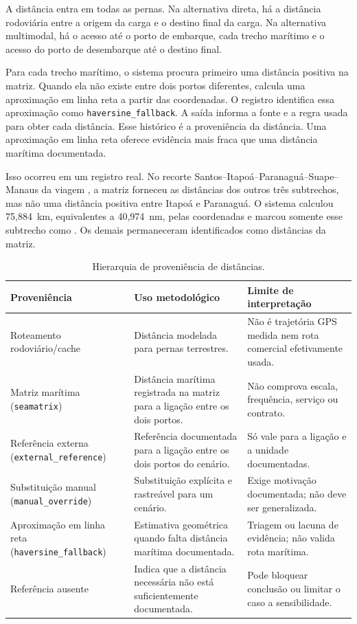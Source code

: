 A distância entra em todas as pernas. Na alternativa direta, há a distância rodoviária entre a origem da carga e o destino final da carga. Na alternativa multimodal, há o acesso até o porto de embarque, cada trecho marítimo e o acesso do porto de desembarque até o destino final.

Para cada trecho marítimo, o sistema procura primeiro uma distância positiva na matriz. Quando ela não existe entre dois portos diferentes, calcula uma aproximação em linha reta a partir das coordenadas. O registro identifica essa aproximação como \texttt{haversine\_fallback}. A saída informa a fonte e a regra usada para obter cada distância. Esse histórico é a proveniência da distância. Uma aproximação em linha reta oferece evidência mais fraca que uma distância marítima documentada.

Isso ocorreu em um registro real. No recorte Santos--Itapoá--Paranaguá--Suape--Manaus da viagem , a matriz forneceu as distâncias dos outros três subtrechos, mas não uma distância positiva entre Itapoá e Paranaguá. O sistema calculou 75,884~km, equivalentes a 40,974~nm, pelas coordenadas e marcou somente esse subtrecho como . Os demais permaneceram identificados como distâncias da matriz.

\begin{table}[htbp]
\centering
\small
\caption{Hierarquia de proveniência de distâncias.}
\label{tab:proveniencia-distancias}
\begin{tabularx}{\textwidth}{L{0.24\textwidth}Y Y}
\toprule
Proveniência & Uso metodológico & Limite de interpretação \\
\midrule
Roteamento rodoviário/cache & Distância modelada para pernas terrestres. & Não é trajetória GPS medida nem rota comercial efetivamente usada.\\
Matriz marítima (\texttt{seamatrix}) & Distância marítima registrada na matriz para a ligação entre os dois portos. & Não comprova escala, frequência, serviço ou contrato.\\
Referência externa (\texttt{external\_reference}) & Referência documentada para a ligação entre os dois portos do cenário. & Só vale para a ligação e a unidade documentadas.\\
Substituição manual (\texttt{manual\_override}) & Substituição explícita e rastreável para um cenário. & Exige motivação documentada; não deve ser generalizada.\\
Aproximação em linha reta (\texttt{haversine\_fallback}) & Estimativa geométrica quando falta distância marítima documentada. & Triagem ou lacuna de evidência; não valida rota marítima.\\
Referência ausente & Indica que a distância necessária não está suficientemente documentada. & Pode bloquear conclusão ou limitar o caso a sensibilidade.\\
\bottomrule
\end{tabularx}
\end{table}

